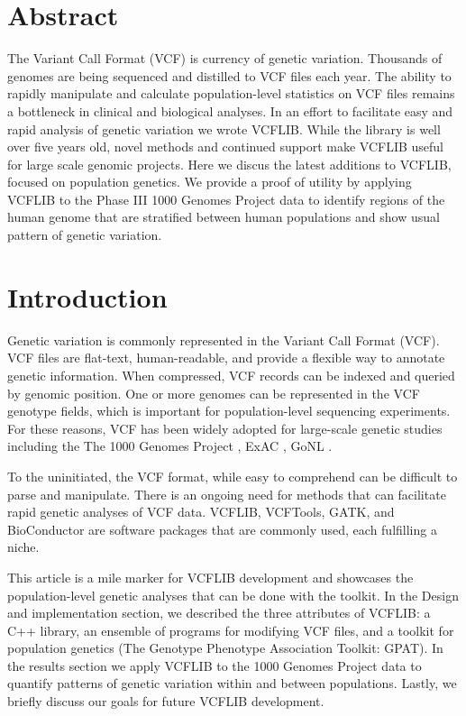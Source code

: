 \documentclass[10pt,letterpaper]{article}
\begin{document}
\section*{Abstract}

The Variant Call Format (VCF) is currency of genetic variation.  Thousands of genomes are being sequenced and distilled to VCF files each year. The ability to rapidly manipulate and calculate population-level statistics on VCF files remains a bottleneck in clinical and biological analyses.  In an effort to facilitate easy and rapid analysis of genetic variation we wrote VCFLIB.  While the library is well over five years old, novel methods and continued support make VCFLIB useful for large scale genomic projects.  Here we discus the latest additions to VCFLIB, focused on population genetics.  We provide a proof of utility by applying VCFLIB to the Phase III 1000 Genomes Project data to identify regions of the human genome that are stratified between human populations and show usual pattern of genetic variation.

\linenumbers

\section*{Introduction}

Genetic variation is commonly represented in the Variant Call Format (VCF)\cite{vcftools}.  VCF files are flat-text, human-readable, and provide a flexible way to annotate genetic information.  When compressed, VCF records can be indexed and queried by genomic position\cite{tabix}. One or more genomes can be represented in the VCF genotype fields, which is important for population-level sequencing experiments. For these reasons, VCF has been widely adopted for large-scale genetic studies including the The 1000 Genomes Project \cite{1kg}, ExAC \cite{exac}, GoNL \cite{gonl}.

To the uninitiated, the VCF format, while easy to comprehend can be difficult to parse and manipulate. There is an ongoing need for methods that can facilitate rapid genetic analyses of VCF data.  VCFLIB, VCFTools\cite{vcftools}, GATK\cite{mckenna,depristo},  and BioConductor are software packages that are commonly used, each fulfilling a niche. 

This article is a mile marker for VCFLIB development and showcases the population-level genetic analyses that can be done with the toolkit. In the Design and implementation section, we described the three attributes of VCFLIB: a C++ library, an ensemble of programs for modifying VCF files, and a toolkit for population genetics (The Genotype Phenotype Association Toolkit: GPAT). In the results section we apply VCFLIB to the 1000 Genomes Project data to quantify patterns of genetic variation within and between populations.  Lastly, we briefly discuss our goals for future VCFLIB development.
\end{document}

